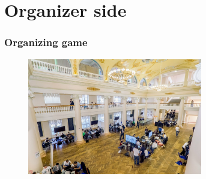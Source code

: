 \documentclass{beamer}
\begin{document}
\section{Organizer side}

\frame
{
\frametitle{Organizing game}
\begin{figure}
\includegraphics[width=3in,height=2in]{pics/ructf12.jpg}
\end{figure}
}
\end{document}
